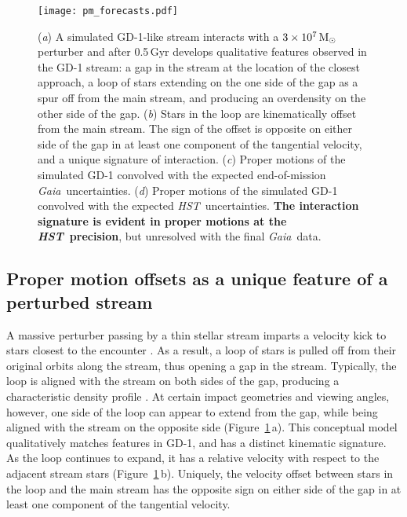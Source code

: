 \documentclass[12pt]{article}
\newcommand{\hst}{\textsl{HST}}
\newcommand{\gaia}{\textsl{Gaia}}
\begin{document}
\begin{figure}
\begin{center}
\texttt{[image: pm\_forecasts.pdf]}
\end{center}
\caption{
(\emph{a}) A simulated GD-1-like stream interacts with a $3\times10^7\,\rm M_\odot$ perturber and after 0.5\,Gyr develops qualitative features observed in the GD-1 stream: a gap in the stream at the location of the closest approach, a loop of stars extending on the one side of the gap as a spur off from the main stream, and producing an overdensity on the other side of the gap.
(\emph{b}) Stars in the loop are kinematically offset from the main stream.
The sign of the offset is opposite on either side of the gap in at least one component of the tangential velocity, and a unique signature of interaction.
(\emph{c}) Proper motions of the simulated GD-1 convolved with the expected end-of-mission \gaia\ uncertainties.
(\emph{d}) Proper motions of the simulated GD-1 convolved with the expected \hst\ uncertainties.
{\bf The interaction signature is evident in proper motions at the \hst\ precision}, but unresolved with the final \gaia\ data.
}
\label{fig:fiducial}
\end{figure}

\subsection*{Proper motion offsets as a unique feature of a perturbed stream}
A massive perturber passing by a thin stellar stream imparts a velocity kick to stars closest to the encounter \parencite[e.g.,][]{erkal2015}.
As a result, a loop of stars is pulled off from their original orbits along the stream, thus opening a gap in the stream.
Typically, the loop is aligned with the stream on both sides of the gap, producing a characteristic density profile \parencite[e.g.,][]{carlberg2013}.
At certain impact geometries and viewing angles, however, one side of the loop can appear to extend from the gap, while being aligned with the stream on the opposite side (Figure~\ref{fig:fiducial}\,a).
This conceptual model qualitatively matches features in GD-1, and has a distinct kinematic signature.
As the loop continues to expand, it has a relative velocity with respect to the adjacent stream stars (Figure~\ref{fig:fiducial}\,b).
Uniquely, the velocity offset between stars in the loop and the main stream has the opposite sign on either side of the gap in at least one component of the tangential velocity.
\end{document}
